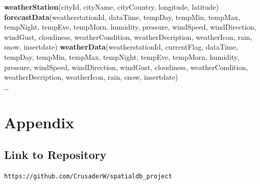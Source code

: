 \documentclass[paper=a4, fontsize=11pt]{article} %
\numberwithin{equation}{section} %
\numberwithin{figure}{section} %
\numberwithin{table}{section} %
\begin{document}
\textbf{weatherStation}(cityId, cityName, cityCountry, longitude, latitude)\newline
\textbf{forecastData}(weatherstationId, dataTime, tempDay, tempMin, tempMax, tempNight, tempEve, tempMorn, humidity, pressure, windSpeed, windDirection, windGust, cloudiness, weatherCondition, weatherDecription, weatherIcon, rain, snow, insertdate)\newline
\textbf{weatherData}(weatherstationId, currentFlag, dataTime, tempDay, tempMin, tempMax, tempNight, tempEve, tempMorn, humidity, pressure, windSpeed, windDirection, windGust, cloudiness, weatherCondition, weatherDecription, weatherIcon, rain, snow, insertdate)\\
\ldots

\section{Appendix}
\subsection{Link to Repository}
\begin{lstlisting}
https://github.com/CrusaderW/spatialdb_project
\end{lstlisting}
\end{document}
